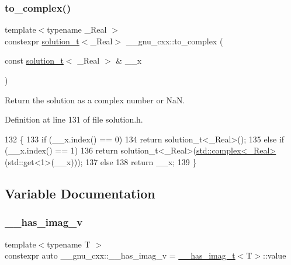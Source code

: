 \subsubsection{\texorpdfstring{to\+\_\+complex()}{to\_complex()}}
{\footnotesize\ttfamily template$<$typename \+\_\+\+Real $>$ \\
constexpr \hyperlink{namespace____gnu__cxx_ae20ea642de50eb361074c62676b0159c}{solution\+\_\+t}$<$\+\_\+\+Real$>$ \+\_\+\+\_\+gnu\+\_\+cxx\+::to\+\_\+complex (\begin{DoxyParamCaption}\item[{const \hyperlink{namespace____gnu__cxx_ae20ea642de50eb361074c62676b0159c}{solution\+\_\+t}$<$ \+\_\+\+Real $>$ \&}]{\+\_\+\+\_\+x }\end{DoxyParamCaption})}

Return the solution as a complex number or NaN. 

Definition at line 131 of file solution.\+h.


\begin{DoxyCode}
132     \{
133       \textcolor{keywordflow}{if} (\_\_x.index() == 0)
134         \textcolor{keywordflow}{return} solution\_t<\_Real>();
135       \textcolor{keywordflow}{else} \textcolor{keywordflow}{if} (\_\_x.index() == 1)
136         \textcolor{keywordflow}{return} solution\_t<\_Real>(\hyperlink{classstd_1_1complex}{std::complex<\_Real>}(std::get<1>(\_\_x)));
137       \textcolor{keywordflow}{else}
138         \textcolor{keywordflow}{return} \_\_x;
139     \}
\end{DoxyCode}


\subsection{Variable Documentation}
\mbox{\label{namespace____gnu__cxx_afa2404a914b06f950f3a46e75aca51a9}} 
\subsubsection{\texorpdfstring{\+\_\+\+\_\+has\+\_\+imag\+\_\+v}{\_\_has\_imag\_v}}
{\footnotesize\ttfamily template$<$typename T $>$ \\
constexpr auto \+\_\+\+\_\+gnu\+\_\+cxx\+::\+\_\+\+\_\+has\+\_\+imag\+\_\+v = \hyperlink{struct____gnu__cxx_1_1____has__imag__t}{\+\_\+\+\_\+has\+\_\+imag\+\_\+t}$<$T$>$\+::value}



